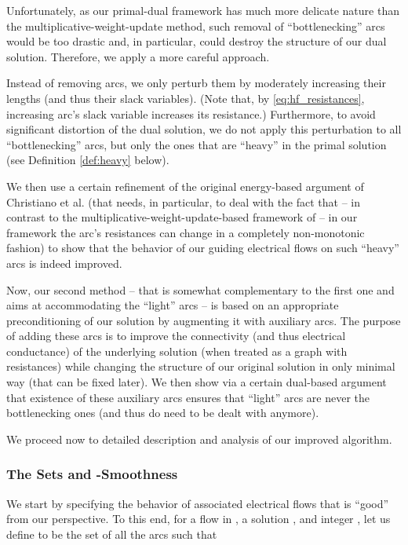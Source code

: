 \documentclass[11pt, letterpaper]{article}
\begin{document}
Unfortunately, as our primal-dual framework has much more delicate nature than the multiplicative-weight-update method, such removal of ``bottlenecking'' arcs would be too drastic and, in particular, could destroy the structure of our dual solution. Therefore, we apply a more careful approach. 

Instead of removing arcs, we only perturb them by moderately increasing their lengths (and thus their slack variables). (Note that, by \eqref{eq:hf_resistances}, increasing arc's slack variable increases its resistance.) Furthermore, to avoid significant distortion of the dual solution, we do not apply this perturbation to all ``bottlenecking'' arcs, but only the ones that are ``heavy'' in the primal solution (see Definition \ref{def:heavy} below). 

We then use a certain refinement of the original energy-based argument of Christiano et al. \cite{ChristianoKMST11} (that needs, in particular, to deal with the fact that -- in contrast to the multiplicative-weight-update-based framework of \cite{ChristianoKMST11} -- in our framework the arc's resistances can change in a completely non-monotonic fashion) to show that the behavior of our guiding electrical flows on such ``heavy'' arcs is indeed improved. 

Now, our second method -- that is somewhat complementary to the first one and aims at accommodating the ``light'' arcs -- is based on an appropriate preconditioning of our solution by augmenting it with auxiliary arcs. The purpose of adding these arcs is to improve the connectivity (and thus electrical conductance) of the underlying solution (when treated as a graph with resistances) while changing the structure of our original solution in only minimal way (that can be fixed later). We then show via a certain dual-based argument that existence of these auxiliary arcs ensures that ``light'' arcs are never the bottlenecking ones (and thus do need to be dealt with anymore). 

We proceed now to detailed description and analysis of our improved algorithm.

\subsubsection*{The Sets  and -Smoothness}


We start by specifying the behavior of associated electrical flows that is ``good'' from our perspective. To this end, for a flow  in , a solution , and integer , let us define  to be the set of all the arcs  such that
\end{document}
